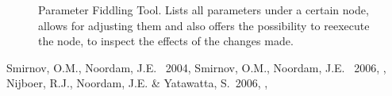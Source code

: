 \documentclass[11pt,twoside]{article}  %
\begin{document}
\begin{figure}
\caption{Parameter Fiddling Tool. Lists all parameters
under a certain node, allows for adjusting them and also offers the
possibility to reexecute the node, to inspect the effects of the
changes made.}
\end{figure}




%
%
%
\begin{references}
 Smirnov, O.M., Noordam, J.E. \ 2004, \adassxiii
{} Smirnov, O.M., Noordam, J.E. \ 2006, \adassxv, 
 Nijboer, R.J., Noordam, J.E. \& Yatawatta, S.\ 2006,
\adassxv, 

\end{references}

\end{document}
